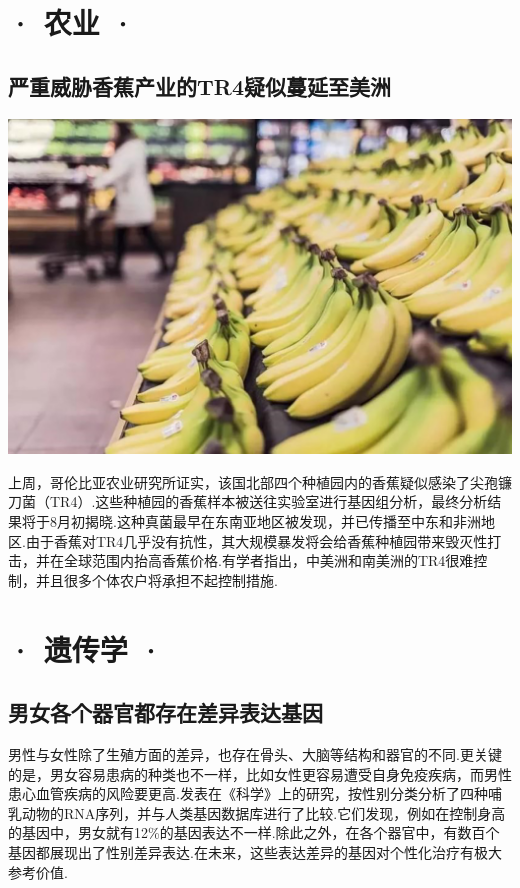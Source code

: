 \ADyixuehui
\newpage
{}
\begin{multicols}{2}
\section*{· 农业 ·}

\subsection*{严重威胁香蕉产业的TR4疑似蔓延至美洲}

{\centering\includegraphics[width=0.8\linewidth]{Interstellar/IMG/201907/09.jpg}\vskip0cm}

上周，哥伦比亚农业研究所证实，该国北部四个种植园内的香蕉疑似感染了尖孢镰刀菌（TR4）.这些种植园的香蕉样本被送往实验室进行基因组分析，最终分析结果将于8月初揭晓.这种真菌最早在东南亚地区被发现，并已传播至中东和非洲地区.由于香蕉对TR4几乎没有抗性，其大规模暴发将会给香蕉种植园带来毁灭性打击，并在全球范围内抬高香蕉价格.有学者指出，中美洲和南美洲的TR4很难控制，并且很多个体农户将承担不起控制措施.

\section*{· 遗传学 ·}

\subsection*{男女各个器官都存在差异表达基因}

男性与女性除了生殖方面的差异，也存在骨头、大脑等结构和器官的不同.更关键的是，男女容易患病的种类也不一样，比如女性更容易遭受自身免疫疾病，而男性患心血管疾病的风险要更高.发表在《科学》上的研究，按性别分类分析了四种哺乳动物的RNA序列，并与人类基因数据库进行了比较.它们发现，例如在控制身高的基因中，男女就有12\%的基因表达不一样.除此之外，在各个器官中，有数百个基因都展现出了性别差异表达.在未来，这些表达差异的基因对个性化治疗有极大参考价值.


\end{multicols}
